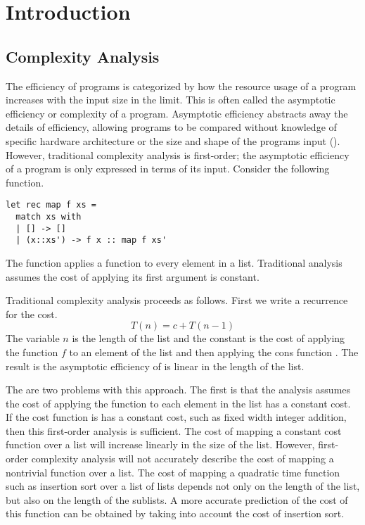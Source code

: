 \chapter{Introduction}

\section{Complexity Analysis}

The efficiency of programs is categorized by how the resource usage of a
program increases with the input size in the limit.  This is often called the
asymptotic efficiency or complexity of a program.  Asymptotic efficiency
abstracts away the details of efficiency, allowing programs to be compared
without knowledge of specific hardware architecture or the size and shape of
the programs input (\citet{Cormen2001}).  However, traditional complexity
analysis is first-order; the asymptotic efficiency of a program is only
expressed in terms of its input.  Consider the following function.
%
\lstset{language=[Objective]Caml}
\begin{lstlisting}
let rec map f xs =
  match xs with
  | [] -> []
  | (x::xs') -> f x :: map f xs'
\end{lstlisting}
%
The function  applies a function to every element in a list.
Traditional analysis assumes the cost of applying its first argument is
constant.




Traditional complexity analysis proceeds as follows.  First we write a
recurrence for the cost.  \[ T(n) = c + T(n-1) \] The variable $n$ is the
length of the list and the constant  is the cost of applying the function
$f$ to an element of the list and then applying the cons function \T{::}. The
result is the asymptotic efficiency of  is linear in the length of the
list.



The are two problems with this approach.  The first is that the analysis
assumes the cost of applying the function  to each element in the list has
a constant cost. If the cost function is has a constant cost, such as fixed
width integer addition, then this first-order analysis is sufficient.  The cost
of mapping a constant cost function over a list will increase linearly in the
size of the list.  However, first-order complexity analysis will not accurately
describe the cost of mapping a nontrivial function over a list. The cost of
mapping a quadratic time function such as insertion sort over a list of lists
depends not only on the length of the list, but also on the length of the
sublists.  A more accurate prediction of the cost of this function can be
obtained by taking into account the cost of insertion sort.



